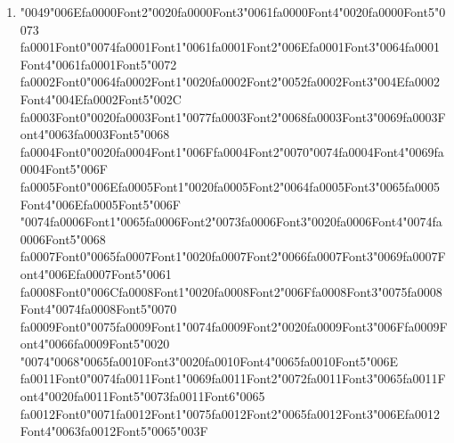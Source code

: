 \documentclass[11pt]{article}
\begin{document}
\begin{enumerate}[label=Q\arabic*., leftmargin=*]
\item {\char"0049}{\char"006E}{\csname fa0000Font2\endcsname\char"0020}{\csname fa0000Font3\endcsname\char"0061}{\csname fa0000Font4\endcsname\char"0020}{\csname fa0000Font5\endcsname\char"0073} {\csname fa0001Font0\endcsname\char"0074}{\csname fa0001Font1\endcsname\char"0061}{\csname fa0001Font2\endcsname\char"006E}{\csname fa0001Font3\endcsname\char"0064}{\csname fa0001Font4\endcsname\char"0061}{\csname fa0001Font5\endcsname\char"0072} {\csname fa0002Font0\endcsname\char"0064}{\csname fa0002Font1\endcsname\char"0020}{\csname fa0002Font2\endcsname\char"0052}{\csname fa0002Font3\endcsname\char"004E}{\csname fa0002Font4\endcsname\char"004E}{\csname fa0002Font5\endcsname\char"002C} {\csname fa0003Font0\endcsname\char"0020}{\csname fa0003Font1\endcsname\char"0077}{\csname fa0003Font2\endcsname\char"0068}{\csname fa0003Font3\endcsname\char"0069}{\csname fa0003Font4\endcsname\char"0063}{\csname fa0003Font5\endcsname\char"0068} {\csname fa0004Font0\endcsname\char"0020}{\csname fa0004Font1\endcsname\char"006F}{\csname fa0004Font2\endcsname\char"0070}{\char"0074}{\csname fa0004Font4\endcsname\char"0069}{\csname fa0004Font5\endcsname\char"006F} {\csname fa0005Font0\endcsname\char"006E}{\csname fa0005Font1\endcsname\char"0020}{\csname fa0005Font2\endcsname\char"0064}{\csname fa0005Font3\endcsname\char"0065}{\csname fa0005Font4\endcsname\char"006E}{\csname fa0005Font5\endcsname\char"006F} {\char"0074}{\csname fa0006Font1\endcsname\char"0065}{\csname fa0006Font2\endcsname\char"0073}{\csname fa0006Font3\endcsname\char"0020}{\csname fa0006Font4\endcsname\char"0074}{\csname fa0006Font5\endcsname\char"0068} {\csname fa0007Font0\endcsname\char"0065}{\csname fa0007Font1\endcsname\char"0020}{\csname fa0007Font2\endcsname\char"0066}{\csname fa0007Font3\endcsname\char"0069}{\csname fa0007Font4\endcsname\char"006E}{\csname fa0007Font5\endcsname\char"0061} {\csname fa0008Font0\endcsname\char"006C}{\csname fa0008Font1\endcsname\char"0020}{\csname fa0008Font2\endcsname\char"006F}{\csname fa0008Font3\endcsname\char"0075}{\csname fa0008Font4\endcsname\char"0074}{\csname fa0008Font5\endcsname\char"0070} {\csname fa0009Font0\endcsname\char"0075}{\csname fa0009Font1\endcsname\char"0074}{\csname fa0009Font2\endcsname\char"0020}{\csname fa0009Font3\endcsname\char"006F}{\csname fa0009Font4\endcsname\char"0066}{\csname fa0009Font5\endcsname\char"0020} {\char"0074}{\char"0068}{\char"0065}{\csname fa0010Font3\endcsname\char"0020}{\csname fa0010Font4\endcsname\char"0065}{\csname fa0010Font5\endcsname\char"006E} {\csname fa0011Font0\endcsname\char"0074}{\csname fa0011Font1\endcsname\char"0069}{\csname fa0011Font2\endcsname\char"0072}{\csname fa0011Font3\endcsname\char"0065}{\csname fa0011Font4\endcsname\char"0020}{\csname fa0011Font5\endcsname\char"0073}{\csname fa0011Font6\endcsname\char"0065} {\csname fa0012Font0\endcsname\char"0071}{\csname fa0012Font1\endcsname\char"0075}{\csname fa0012Font2\endcsname\char"0065}{\csname fa0012Font3\endcsname\char"006E}{\csname fa0012Font4\endcsname\char"0063}{\csname fa0012Font5\endcsname\char"0065}{\char"003F}\\[0.25em]

\end{enumerate}
\end{document}

